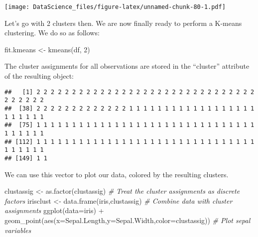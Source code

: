 \documentclass[
]{book}
\newenvironment{Shaded}{\begin{snugshade}}{\end{snugshade}}
\newcommand{\AttributeTok}[1]{\textcolor[rgb]{0.77,0.63,0.00}{#1}}
\newcommand{\CommentTok}[1]{\textcolor[rgb]{0.56,0.35,0.01}{\textit{#1}}}
\newcommand{\DecValTok}[1]{\textcolor[rgb]{0.00,0.00,0.81}{#1}}
\newcommand{\FunctionTok}[1]{\textcolor[rgb]{0.00,0.00,0.00}{#1}}
\newcommand{\NormalTok}[1]{#1}
\newcommand{\OtherTok}[1]{\textcolor[rgb]{0.56,0.35,0.01}{#1}}
\newcommand{\SpecialCharTok}[1]{\textcolor[rgb]{0.00,0.00,0.00}{#1}}
\begin{document}
\texttt{[image: DataScience\_files/figure-latex/unnamed-chunk-80-1.pdf]}

Let's go with 2 clusters then. We are now finally ready to perform a K-means clustering. We do so as follows:

\begin{Shaded}
\begin{Highlighting}[]
\NormalTok{fit.kmeans }\OtherTok{\textless{}{-}} \FunctionTok{kmeans}\NormalTok{(df, }\DecValTok{2}\NormalTok{)}
\end{Highlighting}
\end{Shaded}

The cluster assignments for all observations are stored in the ``cluster'' attribute of the resulting object:

\begin{Shaded}
\end{Shaded}

\begin{verbatim}
##   [1] 2 2 2 2 2 2 2 2 2 2 2 2 2 2 2 2 2 2 2 2 2 2 2 2 2 2 2 2 2 2 2 2 2 2 2 2 2
##  [38] 2 2 2 2 2 2 2 2 2 2 2 2 2 1 1 1 1 1 1 1 1 1 1 1 1 1 1 1 1 1 1 1 1 1 1 1 1
##  [75] 1 1 1 1 1 1 1 1 1 1 1 1 1 1 1 1 1 1 1 1 1 1 1 1 1 1 1 1 1 1 1 1 1 1 1 1 1
## [112] 1 1 1 1 1 1 1 1 1 1 1 1 1 1 1 1 1 1 1 1 1 1 1 1 1 1 1 1 1 1 1 1 1 1 1 1 1
## [149] 1 1
\end{verbatim}

We can use this vector to plot our data, colored by the resulting clusters.

\begin{Shaded}
\begin{Highlighting}[]
\NormalTok{clustassig }\OtherTok{\textless{}{-}} \FunctionTok{as.factor}\NormalTok{(clustassig) }\CommentTok{\# Treat the cluster assignments as discrete factors}
\NormalTok{irisclust }\OtherTok{\textless{}{-}} \FunctionTok{data.frame}\NormalTok{(iris,clustassig) }\CommentTok{\# Combine data with cluster assignments}
\FunctionTok{ggplot}\NormalTok{(}\AttributeTok{data=}\NormalTok{iris) }\SpecialCharTok{+} \FunctionTok{geom\_point}\NormalTok{(}\FunctionTok{aes}\NormalTok{(}\AttributeTok{x=}\NormalTok{Sepal.Length,}\AttributeTok{y=}\NormalTok{Sepal.Width,}\AttributeTok{color=}\NormalTok{clustassig)) }\CommentTok{\# Plot sepal variables}
\end{Highlighting}
\end{Shaded}
\end{document}
